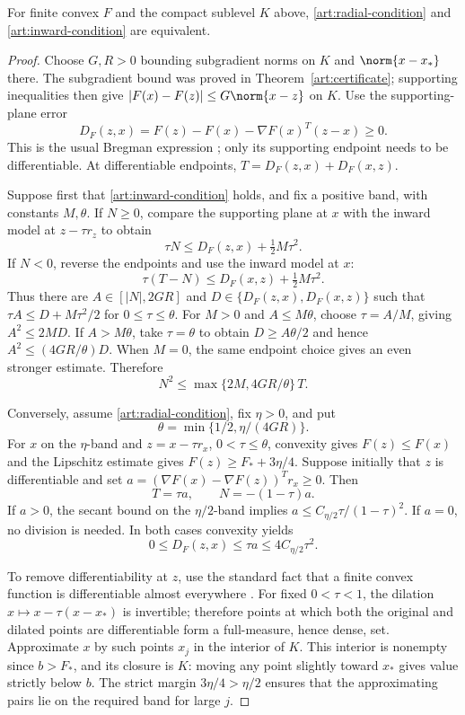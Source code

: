 \begin{theorem}\label{art:radial-equivalence}
For finite convex $F$ and the compact sublevel $K$ above,
\eqref{art:radial-condition} and \eqref{art:inward-condition} are equivalent.
\end{theorem}
\begin{proof}
Choose $G,R>0$ bounding subgradient norms on $K$ and $\norm{x-x_*}$ there.
The subgradient bound was proved in Theorem~\ref{art:certificate}; supporting
inequalities then give $|F(x)-F(z)|\le G\norm{x-z}$ on $K$.
Use the supporting-plane error
\[
 D_F(z,x)=F(z)-F(x)-\nabla F(x)^T(z-x)\ge0.
\]
This is the usual Bregman expression \cite{BB}; only its supporting endpoint
needs to be differentiable. At differentiable endpoints,
$T=D_F(z,x)+D_F(x,z)$.

Suppose first that \eqref{art:inward-condition} holds, and fix a positive band,
with constants $M,\theta$. If $N\ge0$, compare the supporting plane at $x$
with the inward model at $z-\tau r_z$ to obtain
\[
 \tau N\le D_F(z,x)+\tfrac12M\tau^2.
\]
If $N<0$, reverse the endpoints and use the inward model at $x$:
\[
 \tau(T-N)\le D_F(x,z)+\tfrac12M\tau^2.
\]
Thus there are $A\in[|N|,2GR]$ and
$D\in\{D_F(z,x),D_F(x,z)\}$ such that
$\tau A\le D+M\tau^2/2$ for $0\le\tau\le\theta$.
For $M>0$ and $A\le M\theta$, choose $\tau=A/M$, giving $A^2\le2MD$.
If $A>M\theta$, take $\tau=\theta$ to obtain
$D\ge A\theta/2$ and hence $A^2\le(4GR/\theta)D$.
When $M=0$, the same endpoint choice gives an even stronger estimate.
Therefore
\begin{equation}\label{art:inward-to-radial}
 N^2\le \max\{2M,4GR/\theta\}\,T.
\end{equation}

Conversely, assume \eqref{art:radial-condition}, fix $\eta>0$, and put
\[
 \theta=\min\{1/2,\eta/(4GR)\}.
\]
For $x$ on the $\eta$-band and $z=x-\tau r_x$, $0<\tau\le\theta$,
convexity gives $F(z)\le F(x)$ and the Lipschitz estimate gives
$F(z)\ge F_*+3\eta/4$. Suppose initially that $z$ is differentiable and set
$a=(\nabla F(x)-\nabla F(z))^Tr_x\ge0$. Then
\[
 T=\tau a,\qquad N=-(1-\tau)a.
\]
If $a>0$, the secant bound on the $\eta/2$-band implies
$a\le C_{\eta/2}\tau/(1-\tau)^2$. If $a=0$, no division is needed.
In both cases convexity yields
\[
 0\le D_F(z,x)\le\tau a\le4C_{\eta/2}\tau^2.
\]

To remove differentiability at $z$, use the standard fact that a finite convex
function is differentiable almost everywhere \cite[Theorem~25.5]{Rockafellar70}.
For fixed $0<\tau<1$, the dilation $x\mapsto x-\tau(x-x_*)$ is invertible;
therefore points at which both the original and dilated points are
differentiable form a full-measure, hence dense, set. Approximate $x$ by such
points $x_j$ in the interior of $K$. This interior is nonempty since $b>F_*$,
and its closure is $K$: moving any point slightly toward $x_*$ gives value
strictly below $b$. The strict margin $3\eta/4>\eta/2$ ensures that the
approximating pairs lie on the required band for large $j$.


\end{proof}
